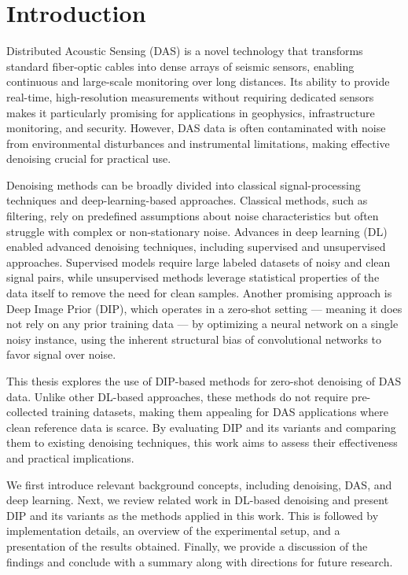 \chapter{Introduction}

Distributed Acoustic Sensing (DAS) is a novel technology that transforms standard fiber-optic cables into dense arrays of seismic sensors, enabling continuous and large-scale monitoring over long distances.
Its ability to provide real-time, high-resolution measurements without requiring dedicated sensors makes it particularly promising for applications in geophysics, infrastructure monitoring, and security.
However, DAS data is often contaminated with noise from environmental disturbances and instrumental limitations, making effective denoising crucial for practical use.

Denoising methods can be broadly divided into classical signal-processing techniques and deep-learning-based approaches. Classical methods, such as filtering, rely on predefined assumptions about noise characteristics but often struggle with complex or non-stationary noise.
Advances in deep learning (DL) enabled advanced denoising techniques, including supervised and unsupervised approaches.
Supervised models require large labeled datasets of noisy and clean signal pairs, while unsupervised methods leverage statistical properties of the data itself to remove the need for clean samples.
Another promising approach is Deep Image Prior (DIP), which operates in a zero-shot setting --- meaning it does not rely on any prior training data --- by optimizing a neural network on a single noisy instance, using the inherent structural bias of convolutional networks to favor signal over noise.

This thesis explores the use of DIP-based methods for zero-shot denoising of DAS data.
Unlike other DL-based approaches, these methods do not require pre-collected training datasets, making them appealing for DAS applications where clean reference data is scarce.
By evaluating DIP and its variants and comparing them to existing denoising techniques, this work aims to assess their effectiveness and practical implications.

We first introduce relevant background concepts, including denoising, DAS, and deep learning.
Next, we review related work in DL-based denoising and present DIP and its variants as the methods applied in this work. This is followed by implementation details, an overview of the experimental setup, and a presentation of the results obtained.
Finally, we provide a discussion of the findings and conclude with a summary along with directions for future research.

